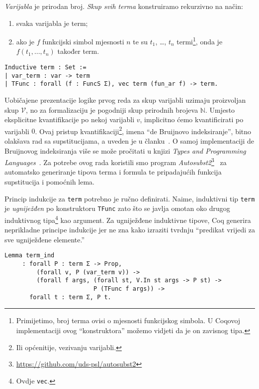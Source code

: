 \pagebreak
\begin{definition}\label{def:term}
  \textit{Varijabla} je prirodan broj. \textit{Skup svih terma} konstruiramo rekurzivno na način:
  \begin{enumerate}
  \item svaka varijabla je term;
  \item ako je \(f\) funkcijski simbol mjesnosti \(n\) te su \(t_{1}\), \ldots, \(t_{n}\) termi\footnote{Primijetimo, broj terma ovisi o mjesnosti funkcijskog simbola. U Coqovoj implementaciji ovog \enquote{konstruktora} možemo vidjeti da je on zavisnog tipa.},
    onda je \(f(t_{1}, \ldots, t_{n})\) također term.
  \end{enumerate}
\begin{verbatim}
Inductive term : Set :=
| var_term : var -> term 
| TFunc : forall (f : FuncS Σ), vec term (fun_ar f) -> term.
\end{verbatim}
\end{definition}
\noindent Uobičajene prezentacije logike prvog reda za
skup varijabli uzimaju proizvoljan skup \(\mathcal{V}\),
no za formalizaciju je pogodniji skup prirodnih brojeva \(\mathbb{N}\).
Umjesto eksplicitne kvantifikacije po nekoj varijabli \(v\),
implicitno ćemo kvantificirati po varijabli \(0\).
Ovaj pristup kvantifikaciji\footnote{Ili općenitije, vezivanju varijabli.}, imena \enquote{de Bruijnovo indeksiranje},
bitno olakšava rad sa supstitucijama, a uveden je u članku~\cite{debruijnamelessdummies}.
O samoj implementaciji de Bruijnovog indeksiranja više se može pročitati u knjizi
\textit{Types and Programming Languages}~\cite{pierce2002tapl}.
Za potrebe ovog rada koristili smo program \textit{Autosubst2}\footnote{\url{https://github.com/uds-psl/autosubst2}}~\cite{stark-phd,autosubst2}
za automatsko generiranje tipova terma i formula te pripadajućih funkcija supstitucija i pomoćnih lema.

Princip indukcije za \texttt{term} potrebno je ručno definirati.
Naime, induktivni tip \texttt{term} je \textit{ugniježđen} po konstruktoru \texttt{TFunc} zato što
se javlja omotan oko drugog induktivnog tipa\footnote{Ovdje \texttt{vec}.} kao argument.
Za ugniježđene induktivne tipove, Coq generira neprikladne principe indukcije jer ne zna
kako izraziti tvrdnju \enquote{predikat vrijedi za sve ugniježđene elemente.}
\begin{verbatim}
Lemma term_ind
     : forall P : term Σ -> Prop,
         (forall v, P (var_term v)) ->
         (forall f args, (forall st, V.In st args -> P st) ->
                         P (TFunc f args)) ->
       forall t : term Σ, P t.
\end{verbatim}

